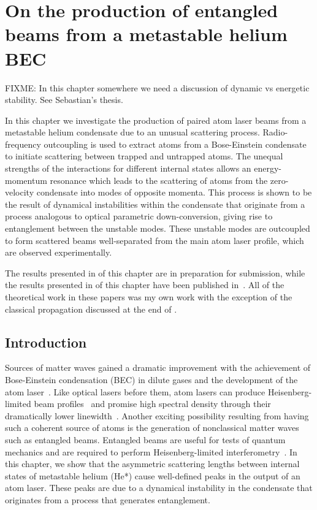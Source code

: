\chapter{On the production of entangled beams from a metastable helium BEC}
\label{Peaks}
\graphicspath{{Figures/Peaks/}{Figures/Common/}}

FIXME: In this chapter somewhere we need a discussion of dynamic vs energetic stability.  See Sebastian's thesis.

In this chapter we investigate the production of paired atom laser beams from a metastable helium condensate due to an unusual scattering process.  Radio-frequency outcoupling is used to extract atoms from a Bose-Einstein condensate to initiate scattering between trapped and untrapped atoms.  The unequal strengths of the interactions for different internal states allows an energy-momentum resonance which leads to the scattering of atoms from the zero-velocity condensate into modes of opposite momenta.  This process is shown to be the result of dynamical instabilities within the condensate that originate from a process analogous to optical parametric down-conversion, giving rise to entanglement between the unstable modes.  These unstable modes are outcoupled to form scattered beams well-separated from the main atom laser profile, which are observed experimentally.

The results presented in  of this chapter are in preparation for submission, while the results presented in  of this chapter have been published in~\citet{Dall:2009}.  All of the theoretical work in these papers was my own work with the exception of the classical propagation discussed at the end of .

\section{Introduction}
Sources of matter waves gained a dramatic improvement with the achievement of Bose-Einstein condensation (BEC) in dilute gases and the development of the atom laser~\citep{Anderson:1995vn,Mewes:1997}. Like optical lasers before them, atom lasers can produce Heisenberg-limited beam profiles~\citep{Busch:2002zr,Riou:2006uq} and promise high spectral density through their dramatically lower linewidth~\citep{Wiseman:1997ba}. Another exciting possibility resulting from having such a coherent source of atoms is the generation of nonclassical matter waves such as entangled beams. Entangled beams are useful for tests of quantum mechanics and are required to perform Heisenberg-limited interferometry~\citep{Dowling:1998,Reid:1988}.  In this chapter, we show that the asymmetric scattering lengths between internal states of metastable helium (He*) cause well-defined peaks in the output of an atom laser.  These peaks are due to a dynamical instability in the condensate that originates from a process that generates entanglement.

